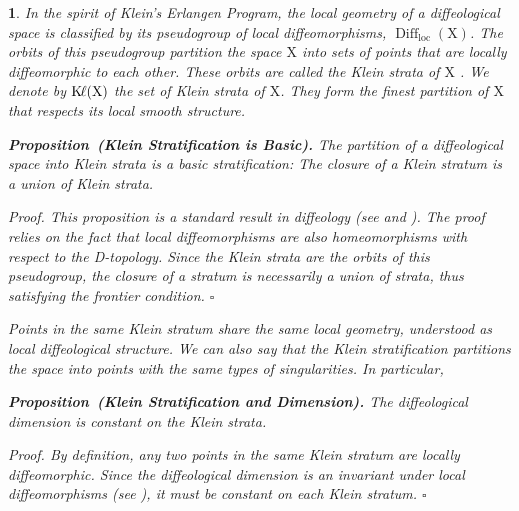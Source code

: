 \documentclass[10pt,reqno,letterpaper,twoside]{amsart}
\theoremstyle{article}
\newtheorem{article}{}
\newenvironment{proposition}[1]%
{\noindent\textbf{Proposition#1.} \it}%
{}
\renewenvironment{proof}%
{\noindent\textit{Proof.}}%
{\nolinebreak\hfill $\square$}
\def \K{\mathrm K}
\def \X{\mathrm X}
\DeclareMathOperator{\Diff}{Diff}
\DeclareMathOperator{\Kl}{{\K\hspace{-1pt}\ell}}
\newcommand{\loc}{\mathrm{loc}}
\begin{document}
\begin{article}
    In the spirit of Klein's Erlangen Program,
    the local geometry of a diffeological space is classified by its pseudogroup of local diffeomorphisms,
    $\Diff_\loc(\X)$.
    The orbits of this pseudogroup partition the space $\X$ into sets of points that are locally diffeomorphic to each other.
    These orbits are called the \emph{Klein strata} of $\X$ \cite[]{PIZ13}.
    We denote by $\Kl(\X)$ the set of Klein strata of $\X$.
    They form the finest partition of $\X$ that respects its local smooth structure.
    
    \begin{proposition}{~(Klein Stratification is Basic)}%
      \label{prop:Klein_basic}
      The partition of a diffeological space into Klein strata is a basic stratification:
      The closure of a Klein stratum is a union of Klein strata.
    \end{proposition}
    
    \begin{proof}
      This proposition is a standard result in diffeology (see \cite[]{PIZ13} and \cite[Section 74]{PIZ25}).
      The proof relies on the fact that local diffeomorphisms are also homeomorphisms with respect to the D-topology.
      Since the Klein strata are the orbits of this pseudogroup,
      the closure of a stratum is necessarily a union of strata,
      thus satisfying the frontier condition.
    \end{proof}
    
    Points in the same Klein stratum share the same local geometry,
    understood as local diffeological structure.
    We can also say that the Klein stratification partitions the space into points with the same types of singularities.
    In particular,
    
    \begin{proposition}{~(Klein Stratification and Dimension)}%
      \label{prop:Klein_dimension}
      The diffeological dimension is constant on the Klein strata.
    \end{proposition}
    
    \begin{proof}
      By definition,
      any two points in the same Klein stratum are locally diffeomorphic.
      Since the diffeological dimension is an invariant under local diffeomorphisms
      (see \cite[]{PIZ13}),
      it must be constant on each Klein stratum.
    \end{proof}
    
  \end{article}
  
\end{document}
